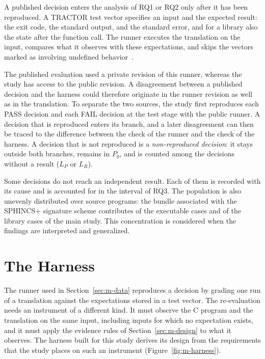 
A published decision enters the analysis of RQ1 or RQ2 only after it has been reproduced. A TRACTOR test vector specifies an input and the expected result: the exit code, the standard output, and the standard error, and for a library also the state after the function call. The runner executes the translation on the input, compares what it observes with these expectations, and skips the vectors marked as involving undefined behavior~\cite{tractor-test-corpus}.

The published evaluation used a private revision of this runner, whereas the study has access to the public revision. A disagreement between a published decision and the harness could therefore originate in the runner revision as well as in the translation. To separate the two sources, the study first reproduces each PASS decision and each FAIL decision at the test stage with the public runner. A decision that is reproduced enters its branch, and a later disagreement can then be traced to the difference between the check of the runner and the check of the harness. A decision that is not reproduced is a \emph{non-reproduced decision}: it stays outside both branches, remains in $P_0$, and is counted among the decisions without a result ($L_P$ or $L_R$).

Some decisions do not reach an independent result. Each of them is recorded with its cause and is accounted for in the interval of RQ3. The population is also unevenly distributed over source programs: the bundle associated with the SPHINCS+ signature scheme contributes \nExePzeroP{} of the \nExePrimary{} executable cases and \nLibPzeroP{} of the \nLibPrimary{} library cases of the main study. This concentration is considered when the findings are interpreted and generalized.

\section{The Harness}\label{sec:m-harness}

The runner used in Section~\ref{sec:m-data} reproduces a decision by grading one run of a translation against the expectations stored in a test vector. The re-evaluation needs an instrument of a different kind. It must observe the C program and the translation on the same input, including inputs for which no expectation exists, and it must apply the evidence rules of Section~\ref{sec:m-design} to what it observes. The harness built for this study derives its design from the requirements that the study places on such an instrument (Figure~\ref{fig:m-harness}).

